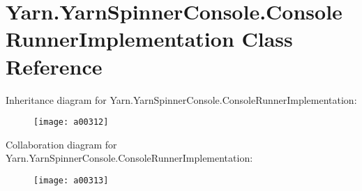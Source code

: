 \hypertarget{a00030}{\section{Yarn.\-Yarn\-Spinner\-Console.\-Console\-Runner\-Implementation Class Reference}
\label{a00030}
}


Inheritance diagram for Yarn.\-Yarn\-Spinner\-Console.\-Console\-Runner\-Implementation\-:
\nopagebreak
\begin{figure}[H]
\begin{center}
\leavevmode
\texttt{[image: a00312]}
\end{center}
\end{figure}


Collaboration diagram for Yarn.\-Yarn\-Spinner\-Console.\-Console\-Runner\-Implementation\-:
\nopagebreak
\begin{figure}[H]
\begin{center}
\leavevmode
\texttt{[image: a00313]}
\end{center}
\end{figure}

